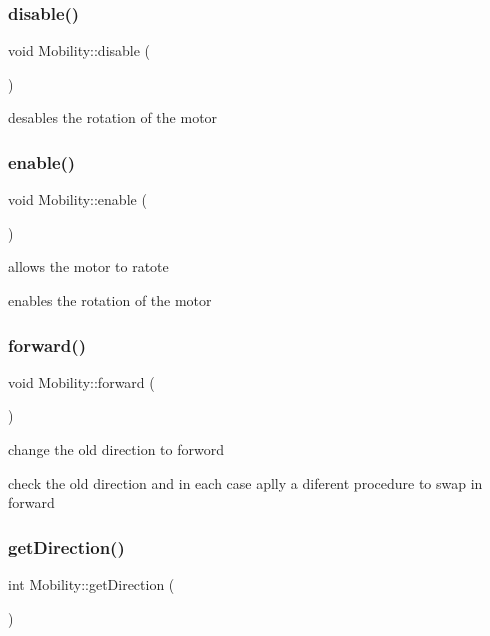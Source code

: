 \subsubsection{\texorpdfstring{disable()}{disable()}}
{\footnotesize\ttfamily void Mobility\+::disable (\begin{DoxyParamCaption}{ }\end{DoxyParamCaption})}



desables the rotation of the motor 

\mbox{\label{class_mobility_a6bb0a09af7f98a5ea18d9752e277de26}} 
\subsubsection{\texorpdfstring{enable()}{enable()}}
{\footnotesize\ttfamily void Mobility\+::enable (\begin{DoxyParamCaption}{ }\end{DoxyParamCaption})}



allows the motor to ratote 

enables the rotation of the motor \mbox{\label{class_mobility_afc3f555847c7beaa9bdbef2217286406}} 
\subsubsection{\texorpdfstring{forward()}{forward()}}
{\footnotesize\ttfamily void Mobility\+::forward (\begin{DoxyParamCaption}{ }\end{DoxyParamCaption})}



change the old direction to forword 

check the old direction and in each case aplly a diferent procedure to swap in forward \mbox{\label{class_mobility_a88345203cab73996114673a780440048}} 
\subsubsection{\texorpdfstring{get\+Direction()}{getDirection()}}
{\footnotesize\ttfamily int Mobility\+::get\+Direction (\begin{DoxyParamCaption}{ }\end{DoxyParamCaption})}



